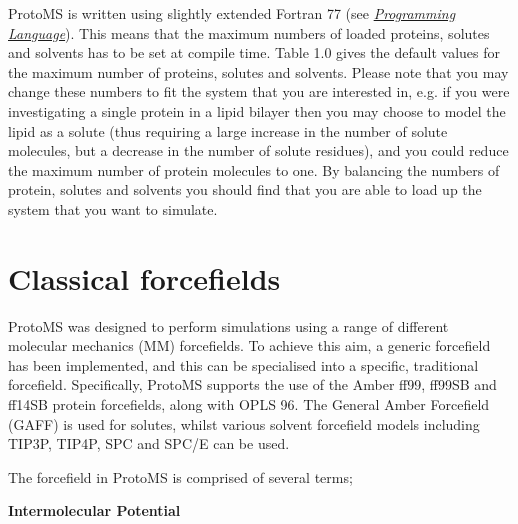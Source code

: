 \documentclass[letterpaper,10pt,english]{sphinxmanual}
\begin{document}
ProtoMS is written using slightly extended Fortran 77 (see {\hyperref[compilation:fortran77]{\emph{Programming Language}}}). This means that the maximum numbers of loaded proteins, solutes and solvents has to be set at compile time. Table 1.0 gives the default values for the maximum number of proteins, solutes and solvents. Please note that you may change these numbers to fit the system that you are interested in, e.g. if you were investigating a single protein in a lipid bilayer then you may choose to model the lipid as a solute (thus requiring a large increase in the number of solute molecules, but a decrease in the number of solute residues), and you could reduce the maximum number of protein molecules to one. By balancing the numbers of protein, solutes and solvents you should find that you are able to load up the system that you want to simulate.


\section{Classical forcefields}
\label{protoms:index-5}\label{protoms:classical-forcefields}
ProtoMS was designed to perform simulations using a range of different molecular mechanics (MM) forcefields. To achieve this aim, a generic forcefield has been implemented, and this can be specialised into a specific, traditional forcefield. Specifically, ProtoMS supports the use of the Amber ff99, ff99SB and ff14SB protein forcefields, along with OPLS 96. The General Amber Forcefield (GAFF) is used for solutes, whilst various solvent forcefield models including TIP3P, TIP4P, SPC and SPC/E can be used.

The forcefield in ProtoMS is comprised of several terms;

\textbf{Intermolecular Potential}
\end{document}
